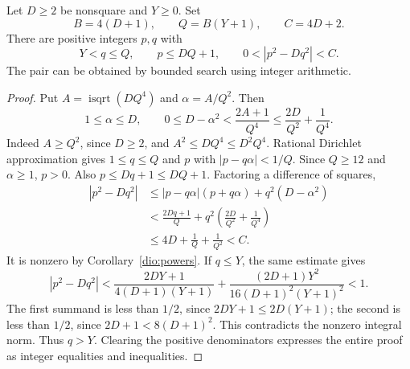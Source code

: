 \begin{lemma}
\label{dio:pell-approx}
Let $D\geq2$ be nonsquare and $Y\geq0$. Set
\[
 B=4(D+1),\qquad Q=B(Y+1),\qquad C=4D+2.
\]
There are positive integers $p,q$ with
\[
 Y<q\leq Q,\qquad p\leq DQ+1,\qquad 0<|p^2-Dq^2|<C.
\]
The pair can be obtained by bounded search using integer arithmetic.
\end{lemma}
\begin{proof}
Put $A=\operatorname{isqrt}(DQ^4)$ and $\alpha=A/Q^2$. Then
\[
 1\leq\alpha\leq D,\qquad
 0\leq D-\alpha^2<\frac{2A+1}{Q^4}
 \leq\frac{2D}{Q^2}+\frac1{Q^4}.
\]
Indeed $A\geq Q^2$, since $D\geq2$, and
$A^2\leq DQ^4\leq D^2Q^4$.
Rational Dirichlet approximation gives $1\leq q\leq Q$ and $p$ with
$|p-q\alpha|<1/Q$. Since $Q\geq12$ and $\alpha\geq1$, $p>0$.
Also $p\leq Dq+1\leq DQ+1$. Factoring a difference of squares,
\[
 \begin{split}
 |p^2-Dq^2|
 &\leq |p-q\alpha|(p+q\alpha)+q^2(D-\alpha^2)\\
 &<\frac{2Dq+1}{Q}
       +q^2\left(\frac{2D}{Q^2}+\frac1{Q^4}\right)\\
 &\leq4D+\frac1Q+\frac1{Q^2}<C.
 \end{split}
\]
It is nonzero by Corollary~\ref{dio:powers}.
If $q\leq Y$, the same estimate gives
\[
 |p^2-Dq^2|
 <\frac{2DY+1}{4(D+1)(Y+1)}
  +\frac{(2D+1)Y^2}{16(D+1)^2(Y+1)^2}<1.
\]
The first summand is less than $1/2$, since
$2DY+1\leq2D(Y+1)$; the second is less than $1/2$, since
$2D+1<8(D+1)^2$. This contradicts the nonzero integral norm.
Thus $q>Y$. Clearing the positive denominators expresses the entire
proof as integer equalities and inequalities.
\end{proof}

